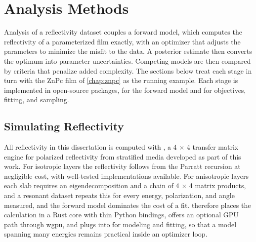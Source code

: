 \section{Analysis Methods}\label{sec:analysis-methods}

Analysis of a reflectivity dataset couples a forward model, which computes the reflectivity of a parameterized film exactly, with an optimizer that adjusts the parameters to minimize the misfit to the data. A posterior estimate then converts the optimum into parameter uncertainties. Competing models are then compared by criteria that penalize added complexity. The sections below treat each stage in turn with the ZnPc film of \cref{chap:znpc} as the running example. Each stage is implemented in open-source packages,  for the forward model and  for objectives, fitting, and sampling.\autocite{nelsonRefnxNeutronXray2019,ALSRSOXSRefloxide2026a}

\subsection{Simulating Reflectivity}\label{sec:simulating-reflectivity}

All reflectivity in this dissertation is computed with , a 4 × 4 transfer matrix engine for polarized reflectivity from stratified media developed as part of this work.\autocite{ALSRSOXSRefloxide2026a} For isotropic layers the reflectivity follows from the Parratt recursion at negligible cost, with well-tested implementations available.\autocite{parrattSurfaceStudiesSolids1954,nelsonRefnxNeutronXray2019} For anisotropic layers each slab requires an eigendecomposition and a chain of 4 × 4 matrix products, and a resonant dataset repeats this for every energy, polarization, and angle measured, and the forward model dominates the cost of a fit.  therefore places the calculation in a Rust core with thin Python bindings, offers an optional GPU path through wgpu, and plugs into  for modeling and fitting, so that a model spanning many energies remains practical inside an optimizer loop.

